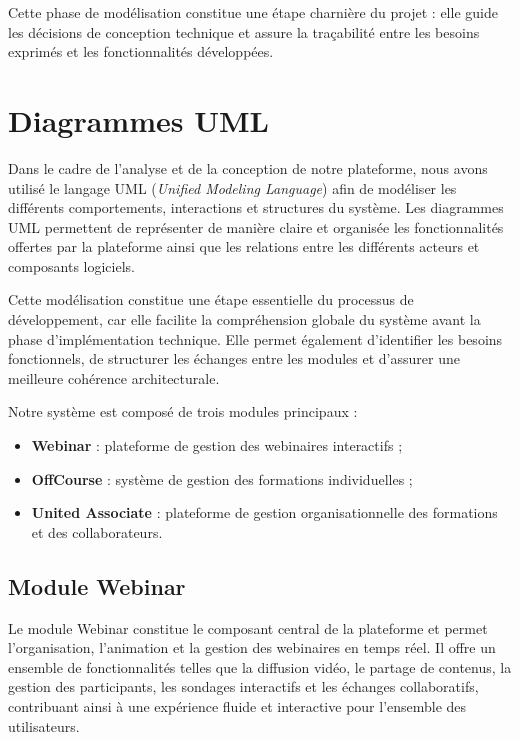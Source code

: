 Cette phase de modélisation constitue une étape charnière du projet : elle guide les décisions de conception technique et assure la traçabilité entre les besoins exprimés et les fonctionnalités développées.

\section{Diagrammes UML}

Dans le cadre de l'analyse et de la conception de notre plateforme, nous avons utilisé le langage UML (\textit{Unified Modeling Language}) afin de modéliser les différents comportements, interactions et structures du système. Les diagrammes UML permettent de représenter de manière claire et organisée les fonctionnalités offertes par la plateforme ainsi que les relations entre les différents acteurs et composants logiciels.

Cette modélisation constitue une étape essentielle du processus de développement, car elle facilite la compréhension globale du système avant la phase d'implémentation technique. Elle permet également d'identifier les besoins fonctionnels, de structurer les échanges entre les modules et d'assurer une meilleure cohérence architecturale.

Notre système est composé de trois modules principaux :
\begin{itemize}
    \item \textbf{Webinar} : plateforme de gestion des webinaires interactifs ;
    \item \textbf{OffCourse} : système de gestion des formations individuelles ;
    \item \textbf{United Associate} : plateforme de gestion organisationnelle des formations et des collaborateurs.
\end{itemize}

\subsection{Module Webinar}
Le module Webinar constitue le composant central de la plateforme et permet l’organisation, l’animation et la gestion des webinaires en temps réel. Il offre un ensemble de fonctionnalités telles que la diffusion vidéo, le partage de contenus, la gestion des participants, les sondages interactifs et les échanges collaboratifs, contribuant ainsi à une expérience fluide et interactive pour l’ensemble des utilisateurs.

